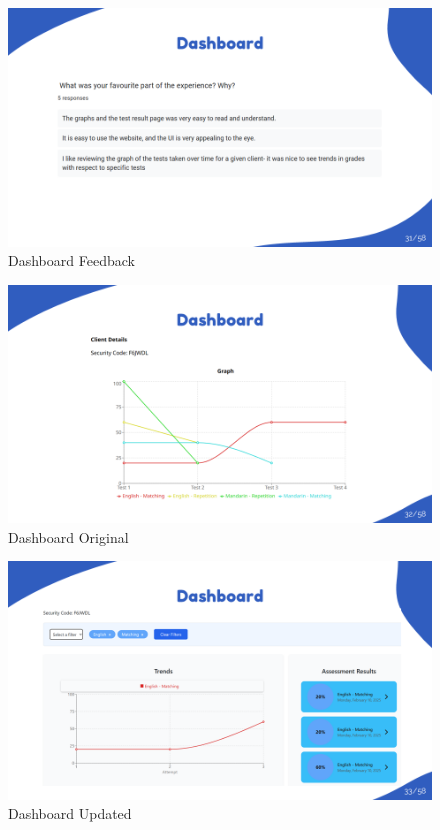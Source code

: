 \documentclass{article}
\begin{document}
\begin{figure}[H]
  \centering
  \includegraphics[width=\textwidth]{images/slide31.png}
  \caption{Dashboard Feedback}
  \label{fig:dashboard_feedback}
\end{figure}

\begin{figure}[H]
  \centering
  \includegraphics[width=\textwidth]{images/slide32.png}
  \caption{Dashboard Original}
  \label{fig:dashboard_original}
\end{figure}

\begin{figure}[H]
  \centering
  \includegraphics[width=\textwidth]{images/slide33.png}
  \caption{Dashboard Updated}
  \label{fig:dashboard_new}
\end{figure}
\end{document}
